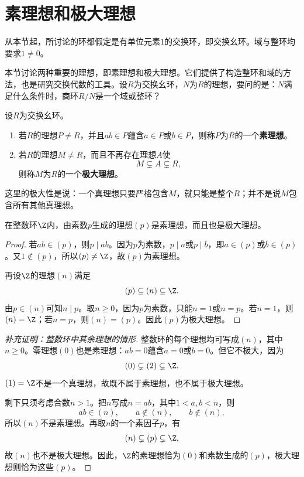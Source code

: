 \section{素理想和极大理想}

从本节起，所讨论的环都假定是有单位元素$1$的交换环，即交换幺环。域与整环均要求$1\ne0$。

本节讨论两种重要的理想，即素理想和极大理想。它们提供了构造整环和域的方法，也是研究交换代数的工具。设$R$为交换幺环，$N$为$R$的理想，要问的是：$N$满足什么条件时，商环$R/N$是一个域或整环？

\begin{definition}
设$R$为交换幺环。
\begin{enumerate}
\item 若$R$的理想$P\ne R$，并且$ab\in P$蕴含$a\in P$或$b\in P$，则称$P$为$R$的一个\textbf{素理想}。
\item 若$R$的理想$M\ne R$，而且不再存在理想$A$使
\[
M\subsetneq A\subsetneq R,
\]
则称$M$为$R$的一个\textbf{极大理想}。
\end{enumerate}
\end{definition}

这里的极大性是说：一个真理想只要严格包含$M$，就只能是整个$R$；并不是说$M$包含所有其他真理想。

\begin{example}
在整数环$\Z$内，由素数$p$生成的理想$(p)$是素理想，而且也是极大理想。
\end{example}
\begin{proof}
若$ab\in(p)$，则$p\mid ab$。因为$p$为素数，$p\mid a$或$p\mid b$，即$a\in(p)$或$b\in(p)$。又$1\notin(p)$，所以$(p)\ne\Z$，故$(p)$为素理想。

再设$\Z$的理想$(n)$满足
\[
(p)\subseteq(n)\subseteq\Z.
\]
由$p\in(n)$可知$n\mid p$。取$n\ge0$，因为$p$为素数，只能$n=1$或$n=p$。若$n=1$，则$(n)=\Z$；若$n=p$，则$(n)=(p)$。因此$(p)$为极大理想。
\end{proof}

\begin{proof}[补充证明：整数环中其余理想的情形]
整数环的每个理想均可写成$(n)$，其中$n\ge0$。零理想$(0)$也是素理想：$ab=0$蕴含$a=0$或$b=0$。但它不极大，因为
\[
(0)\subsetneq(2)\subsetneq\Z.
\]
$(1)=\Z$不是一个真理想，故既不属于素理想，也不属于极大理想。

剩下只须考虑合数$n>1$。把$n$写成$n=ab$，其中$1<a,b<n$，则
\[
ab\in(n),\qquad a\notin(n),\qquad b\notin(n),
\]
所以$(n)$不是素理想。再取$n$的一个素因子$p$，有
\[
(n)\subsetneq(p)\subsetneq\Z,
\]
故$(n)$也不是极大理想。因此，$\Z$的素理想恰为$(0)$和素数生成的$(p)$，极大理想则恰为这些$(p)$。
\end{proof}

